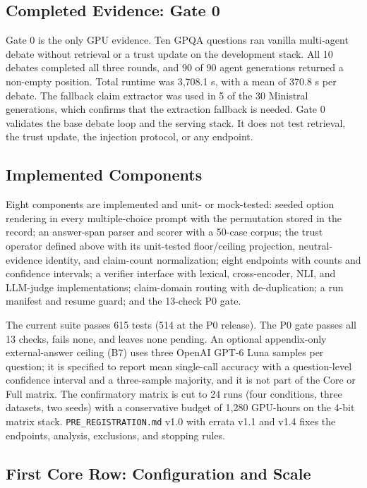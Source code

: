\documentclass[a4paper,fleqn]{cas-sc}
\begin{document}
\subsection{Completed Evidence: Gate 0}

Gate 0 is the only GPU evidence. Ten GPQA questions ran vanilla multi-agent debate without retrieval or a trust update on the development stack. All 10 debates completed all three rounds, and 90 of 90 agent generations returned a non-empty position. Total runtime was 3{,}708.1 s, with a mean of 370.8 s per debate. The fallback claim extractor was used in 5 of the 30 Ministral generations, which confirms that the extraction fallback is needed. Gate 0 validates the base debate loop and the serving stack. It does not test retrieval, the trust update, the injection protocol, or any endpoint.

\subsection{Implemented Components}

Eight components are implemented and unit- or mock-tested: seeded option rendering in every multiple-choice prompt with the permutation stored in the record; an answer-span parser and scorer with a 50-case corpus; the trust operator defined above with its unit-tested floor/ceiling projection, neutral-evidence identity, and claim-count normalization; eight endpoints with counts and confidence intervals; a verifier interface with lexical, cross-encoder, NLI, and LLM-judge implementations; claim-domain routing with de-duplication; a run manifest and resume guard; and the 13-check P0 gate.

The current suite passes 615 tests (514 at the P0 release). The P0 gate passes all 13 checks, fails none, and leaves none pending. An optional appendix-only external-answer ceiling (B7) uses three OpenAI GPT-6 Luna samples per question; it is specified to report mean single-call accuracy with a question-level confidence interval and a three-sample majority, and it is not part of the Core or Full matrix. The confirmatory matrix is cut to 24 runs (four conditions, three datasets, two seeds) with a conservative budget of 1{,}280 GPU-hours on the 4-bit matrix stack. \texttt{PRE\_REGISTRATION.md} v1.0 with errata v1.1 and v1.4 fixes the endpoints, analysis, exclusions, and stopping rules.

\subsection{First Core Row: Configuration and Scale}
\end{document}
